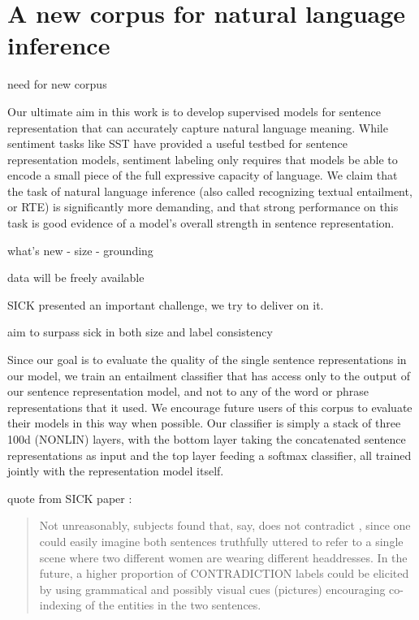 \section{A new corpus for natural language inference}\label{sec:discussion}

need for new corpus

Our ultimate aim in this work is to develop supervised models for sentence representation that can accurately capture natural language meaning. While sentiment tasks like SST have provided a useful testbed for sentence representation models, sentiment labeling only requires that models be able to encode a small piece of the full expressive capacity of language. We claim that the task of natural language inference (also called recognizing textual entailment, or RTE) is significantly more demanding, and that strong performance on this task is good evidence of a model's overall strength in sentence representation.



what's new
- size
- grounding

data will be freely available

SICK presented an important challenge, we try to deliver on it.

aim to surpass sick in both size and label consistency

Since our goal is to evaluate the quality of the single sentence representations in our model, we train an entailment classifier that has access only to the output of our sentence representation model, and not to any of the word or phrase representations that it used. We encourage future users of this corpus to evaluate their models in this way when possible. Our classifier is simply a stack of three 100d (NONLIN) layers, with the bottom layer taking the concatenated sentence representations as input and the top layer feeding a softmax classifier, all trained jointly with the representation model itself.

quote from SICK paper \cite{marelli2014sick}:

\begin{quote}
Not unreasonably, subjects found that, say,  does not contradict , since one could easily imagine both sentences truthfully uttered to refer to a single scene where two different women are wearing different headdresses. In the future, a higher proportion of CONTRADICTION labels could be elicited by using grammatical and possibly visual cues (pictures) encouraging co-indexing of the entities in the two sentences.
\end{quote}

